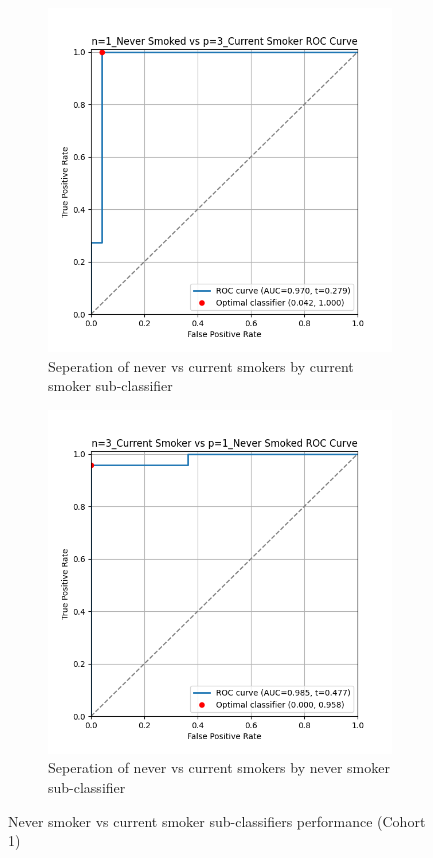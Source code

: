 \documentclass{article}
\begin{document}
\begin{figure}
    \begin{subfigure}{0.48\textwidth}
        \centering
        \includegraphics[width=\linewidth]{cohort1_1v3_roc.png}
        \caption{Seperation of never vs current smokers by current smoker sub-classifier}
    \end{subfigure}
    \hfill
    \begin{subfigure}{0.48\textwidth}
        \centering
        \includegraphics[width=\linewidth]{cohort1_3v1_roc.png}
        \caption{Seperation of never vs current smokers by never smoker sub-classifier}
    \end{subfigure}
    \caption{Never smoker vs current smoker sub-classifiers performance (Cohort 1)}
\end{figure}
\end{document}
